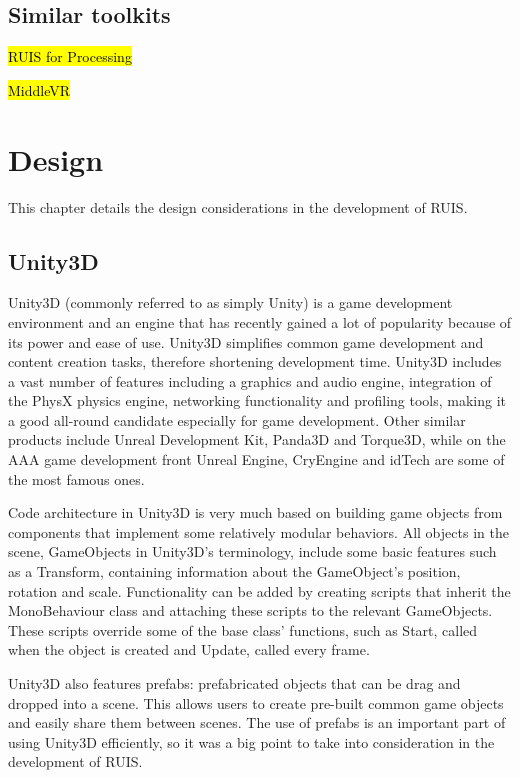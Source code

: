 \documentclass[12pt,a4paper,oneside,pdftex]{report}
\begin{document}
\section{Similar toolkits}
\label{section:similar}

\hl{RUIS for Processing}

\hl{MiddleVR}




\chapter{Design}
\label{chapter:design}

This chapter details the design considerations in the development of RUIS.

\section{Unity3D}
\label{section:unity3d}

Unity3D (commonly referred to as simply Unity) \cite{UnitySite} is a game development environment and an engine that has recently gained a lot of popularity because of its power and ease of use. Unity3D simplifies common game development and content creation tasks, therefore shortening development time. Unity3D includes a vast number of features including a graphics and audio engine, integration of the PhysX physics engine, networking functionality and profiling tools, making it a good all-round candidate especially for game development. Other similar products include Unreal Development Kit, Panda3D and Torque3D, while on the AAA game development front Unreal Engine, CryEngine and idTech are some of the most famous ones.

Code architecture in Unity3D is very much based on building game objects from components that implement some relatively modular behaviors. All objects in the scene, GameObjects in Unity3D's terminology, include some basic features such as a Transform, containing information about the GameObject's position, rotation and scale. Functionality can be added by creating scripts that inherit the MonoBehaviour class and attaching these scripts to the relevant GameObjects. These scripts override some of the base class' functions, such as Start, called when the object is created and Update, called every frame.

Unity3D also features prefabs: prefabricated objects that can be drag and dropped into a scene. This allows users to create pre-built common game objects and easily share them between scenes. The use of prefabs is an important part of using Unity3D efficiently, so it was a big point to take into consideration in the development of RUIS. 
\end{document}
